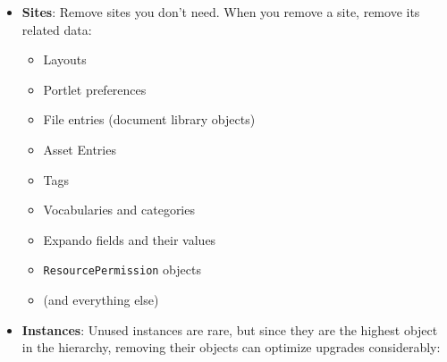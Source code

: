 \begin{itemize}
\item
  \textbf{Sites}: Remove sites you don't need. When you remove a site,
  remove its related data:

  \begin{itemize}
  \item
    Layouts
  \item
    Portlet preferences
  \item
    File entries (document library objects)
  \item
    Asset Entries
  \item
    Tags
  \item
    Vocabularies and categories
  \item
    Expando fields and their values
  \item
    \texttt{ResourcePermission} objects
  \item
    (and everything else)
  \end{itemize}
\item
  \textbf{Instances}: Unused instances are rare, but since they are the
  highest object in the hierarchy, removing their objects can optimize
  upgrades considerably:


\end{itemize}

